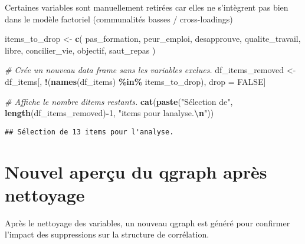 \documentclass[
]{article}
\newenvironment{Shaded}{\begin{snugshade}}{\end{snugshade}}
\newcommand{\CommentTok}[1]{\textcolor[rgb]{0.56,0.35,0.01}{\textit{#1}}}
\newcommand{\ConstantTok}[1]{\textcolor[rgb]{0.56,0.35,0.01}{#1}}
\newcommand{\DecValTok}[1]{\textcolor[rgb]{0.00,0.00,0.81}{#1}}
\newcommand{\FunctionTok}[1]{\textcolor[rgb]{0.13,0.29,0.53}{\textbf{#1}}}
\newcommand{\NormalTok}[1]{#1}
\newcommand{\OtherTok}[1]{\textcolor[rgb]{0.56,0.35,0.01}{#1}}
\newcommand{\SpecialCharTok}[1]{\textcolor[rgb]{0.81,0.36,0.00}{\textbf{#1}}}
\newcommand{\StringTok}[1]{\textcolor[rgb]{0.31,0.60,0.02}{#1}}
\begin{document}
Certaines variables sont manuellement retirées car elles ne s'intègrent
pas bien dans le modèle factoriel (communalités basses / cross-loadings)

\begin{Shaded}
\begin{Highlighting}[]
\NormalTok{items\_to\_drop }\OtherTok{\textless{}{-}} \FunctionTok{c}\NormalTok{(}
  \StringTok{\textquotesingle{}pas\_formation\textquotesingle{}}\NormalTok{,}
  \StringTok{\textquotesingle{}peur\_emploi\textquotesingle{}}\NormalTok{,}
  \StringTok{\textquotesingle{}desapprouve\textquotesingle{}}\NormalTok{,}
  \StringTok{\textquotesingle{}qualite\_travail\textquotesingle{}}\NormalTok{,}
  \StringTok{\textquotesingle{}libre\textquotesingle{}}\NormalTok{,}
  \StringTok{\textquotesingle{}concilier\_vie\textquotesingle{}}\NormalTok{,}
  \StringTok{\textquotesingle{}objectif\textquotesingle{}}\NormalTok{,}
  \StringTok{\textquotesingle{}saut\_repas\textquotesingle{}}
\NormalTok{)}

\CommentTok{\# Crée un nouveau data frame sans les variables exclues.}
\NormalTok{df\_items\_removed }\OtherTok{\textless{}{-}}\NormalTok{ df\_items[, }\SpecialCharTok{!}\NormalTok{(}\FunctionTok{names}\NormalTok{(df\_items) }\SpecialCharTok{\%in\%}\NormalTok{ items\_to\_drop), drop }\OtherTok{=} \ConstantTok{FALSE}\NormalTok{]}

\CommentTok{\# Affiche le nombre d\textquotesingle{}items restants.}
\FunctionTok{cat}\NormalTok{(}\FunctionTok{paste}\NormalTok{(}\StringTok{"Sélection de"}\NormalTok{, }\FunctionTok{length}\NormalTok{(df\_items\_removed)}\SpecialCharTok{{-}}\DecValTok{1}\NormalTok{, }\StringTok{"items pour l\textquotesingle{}analyse.}\SpecialCharTok{\textbackslash{}n}\StringTok{"}\NormalTok{))}
\end{Highlighting}
\end{Shaded}

\begin{verbatim}
## Sélection de 13 items pour l'analyse.
\end{verbatim}

\section{Nouvel aperçu du qgraph après
nettoyage}\label{nouvel-aperuxe7u-du-qgraph-apruxe8s-nettoyage}

Après le nettoyage des variables, un nouveau qgraph est généré pour
confirmer l'impact des suppressions sur la structure de corrélation.
\end{document}
